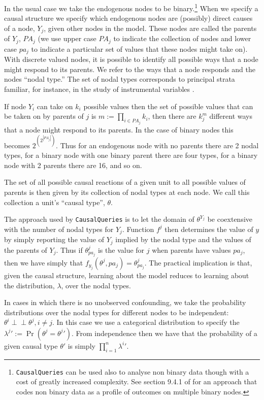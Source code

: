 \documentclass[
  11pt,
  article]{jss}
\begin{document}
In the usual case we take the endogenous nodes to be binary.\footnote{\texttt{CausalQueries}
  can be used also to analyse non binary data though with a cost of
  greatly increased complexity. See section 9.4.1 of \citet{ii2023} for
  an approach that codes non binary data as a profile of outcomes on
  multiple binary nodes.} When we specify a causal structure we specify
which endogenous nodes are (possibly) direct causes of a node, \(Y_j\),
given other nodes in the model. These nodes are called the parents of
\(Y_j\), \(PA_j\) (we use upper case \(PA_j\) to indicate the collection
of nodes and lower case \(pa_j\) to indicate a particular set of values
that these nodes might take on). With discrete valued nodes, it is
possible to identify all possible ways that a node might respond to its
parents. We refer to the ways that a node responds and the nodes ``nodal
type.'' The set of nodal types corresponds to principal strata familiar,
for instance, in the study of instrumental variables
\citep{frangakis2002principal}.

If node \(Y_i\) can take on \(k_i\) possible values then the set of
possible values that can be taken on by parents of \(j\) is
\(m :=\prod_{i\in PA_j}k_i\), then there are \(k_j^{m}\) different ways
that a node might respond to its parents. In the case of binary nodes
this becomes \(2^{\left(2^{|PA_j|}\right)}\). Thus for an endogenous
node with no parents there are 2 nodal types, for a binary node with one
binary parent there are four types, for a binary node with 2 parents
there are 16, and so on.

The set of all possible causal reactions of a given unit to all possible
values of parents is then given by its collection of nodal types at each
node. We call this collection a unit's ``causal type'', \(\theta\).

The approach used by \texttt{CausalQueries} is to let the domain of
\(\theta^{Y_j}\) be coextensive with the number of nodal types for
\(Y_j\). Function \(f^j\) then determines the value of \(y\) by simply
reporting the value of \(Y_j\) implied by the nodal type and the values
of the parents of \(Y_j\). Thus if \(\theta^j_{pa_j}\) is the value for
\(j\) when parents have values \(pa_j\), then we have simply that
\(f_{y_j}(\theta^{j}, pa_j) = \theta^j_{pa_j}\). The practical
implication is that, given the causal structure, learning about the
model reduces to learning about the distribution, \(\lambda\), over the
nodal types.

In cases in which there is no unobserved confounding, we take the
probability distributions over the nodal types for different nodes to be
independent: \(\theta^i \perp\!\!\! \perp \theta^j, i\neq j\). In this
case we use a categorical distribution to specify the
\({\lambda^j}' := \Pr(\theta^j = {\theta^j}')\). From independence then
we have that the probability of a given causal type \(\theta'\) is
simply \(\prod_{i=1}^n {\lambda^i}'\).
\end{document}
